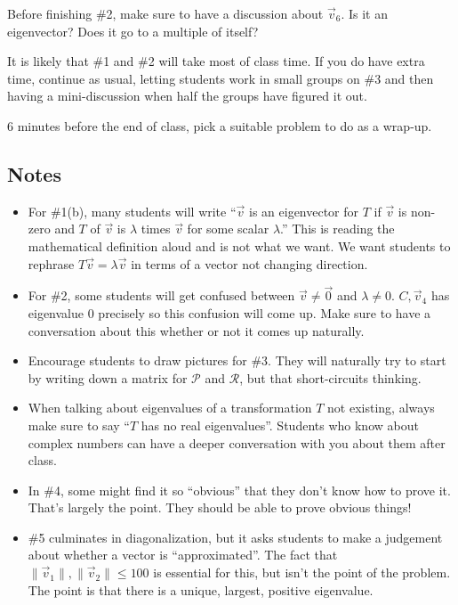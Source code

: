 \documentclass[red]{tutorial}
\theoremstyle{definition}
\theoremstyle{theorem}
\begin{document}
{\begin{instructions}
      Before finishing \#2, make sure to have a discussion about $\vec v_6$. Is it an eigenvector?
      Does it go to a multiple of itself?

      It is likely that \#1 and \#2 will take most of class time. If you do have extra time, continue as usual,
      letting students work in small groups on \#3 and then having a mini-discussion when half the groups
      have figured it out.

      6 minutes before the end of class, pick a suitable problem to do as a wrap-up.


      \subsection*{Notes}
      \begin{itemize}
        \item For \#1(b), many students will write ``$\vec v$ is an eigenvector for $T$ if
          $\vec v$ is non-zero and $T$ of $\vec v$ is $\lambda$ times $\vec v$ for some scalar
          $\lambda$.'' This is reading the mathematical definition aloud and is not what we want.
          We want students to rephrase $T\vec v=\lambda \vec v$ in terms of a vector not changing
          direction.
        \item For \#2, some students will get confused between $\vec v\neq \vec 0$ and $\lambda \neq 0$.
          $C,\vec v_4$ has eigenvalue $0$ precisely so this confusion will come up. Make sure to
          have a conversation about this whether or not it comes up naturally.
        \item Encourage students to draw pictures for \#3. They will naturally try to start by writing
          down a matrix for $\mathcal P$ and $\mathcal R$, but that short-circuits thinking.
        \item
          When talking about eigenvalues of a transformation $T$
          not existing, always make sure to say ``$T$ has no real eigenvalues''. Students who
          know about complex numbers can have a deeper conversation with you about them after class.
        \item In \#4, some might find it so ``obvious'' that they don't know how to prove it. That's largely
          the point. They should be able to prove obvious things!
        \item \#5 culminates in diagonalization, but it asks students to make a judgement about whether
          a vector is ``approximated''. The fact that $\|\vec v_1\|,\|\vec v_2\|\leq 100$ is essential
          for this, but isn't the point of the problem. The point is that there is a unique, largest, positive
          eigenvalue.
      \end{itemize}
    \end{instructions}
    }
    
\end{document}
